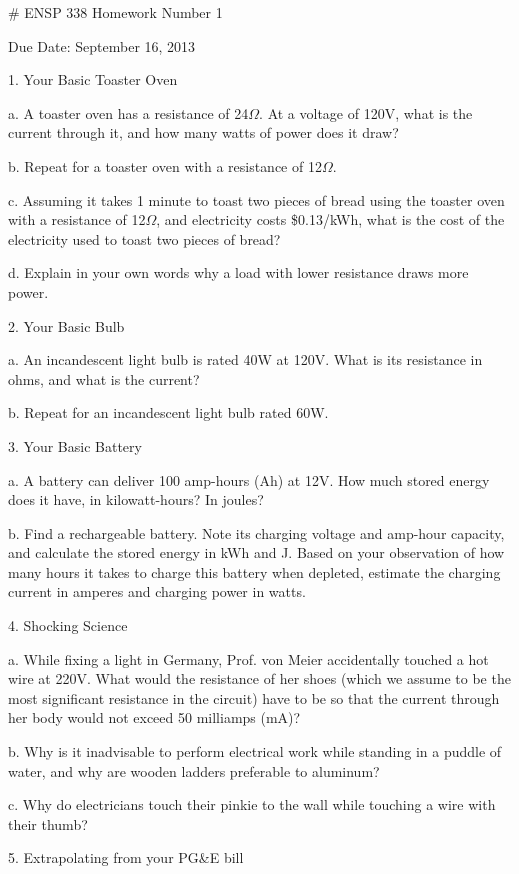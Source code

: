 # ENSP 338 Homework Number 1

Due Date:	September 16, 2013

1. Your Basic Toaster Oven

    a. A toaster oven has a resistance of 24$\Omega$.  At a voltage of 120V,
    what is the current through it, and how many watts of power does it
    draw?

    b. Repeat for a toaster oven with a resistance of 12$\Omega$.

    c. Assuming it takes 1 minute to toast two pieces of bread using the
    toaster oven with a resistance of 12$\Omega$, and electricity costs
    \$0.13/kWh, what is the cost of the electricity used to toast two
    pieces of bread?

    d. Explain in your own words why a load with lower resistance draws
    more power.

2. Your Basic Bulb

    a. An incandescent light bulb is rated 40W at 120V.  What is its
    resistance in ohms, and what is the current?

    b. Repeat for an incandescent light bulb rated 60W.

3. Your Basic Battery

    a. A battery can deliver 100 amp-hours (Ah) at 12V.  How much stored
    energy does it have, in kilowatt-hours?  In joules?

    b. Find a rechargeable battery. Note its charging voltage and
    amp-hour capacity, and calculate the stored energy in kWh and J.
    Based on your observation of how many hours it takes to charge this
    battery when depleted, estimate the charging current in amperes and
    charging power in watts.

4. 	Shocking Science

    a. While fixing a light in Germany, Prof. von Meier accidentally
    touched a hot wire at 220V.  What would the resistance of her shoes
    (which we assume to be the most significant resistance in the
    circuit) have to be so that the current through her body would not
    exceed 50 milliamps (mA)?

    b. Why is it inadvisable to perform electrical work while standing
    in a puddle of water, and 	why are wooden ladders preferable to
    aluminum?

    c. Why do electricians touch their pinkie to the wall while touching
    a wire with their thumb?

5. 	Extrapolating from your PG&E bill

